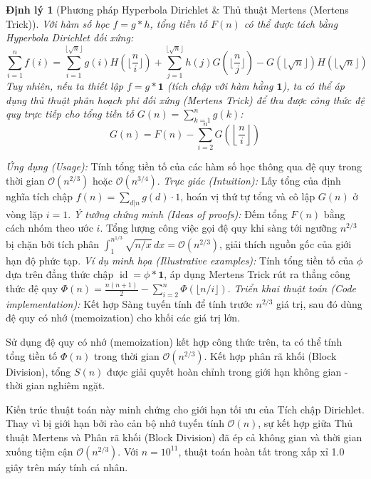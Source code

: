 \documentclass{article}
\newtheorem{dinhly}{Định lý}
\begin{document}
\begin{dinhly}[Phương pháp Hyperbola Dirichlet \& Thủ thuật Mertens (Mertens Trick)]
Với hàm số học $f = g * h$, tổng tiền tố $F(n)$ có thể được tách bằng Hyperbola Dirichlet đối xứng:
\begin{equation*}
    \sum_{i=1}^n f(i) = \sum_{i=1}^{\lfloor\sqrt{n}\rfloor} g(i) H\left(\lfloor\frac{n}{i}\rfloor\right) + \sum_{j=1}^{\lfloor\sqrt{n}\rfloor} h(j) G\left(\lfloor\frac{n}{j}\rfloor\right) - G(\lfloor\sqrt{n}\rfloor) H(\lfloor\sqrt{n}\rfloor)
\end{equation*}
Tuy nhiên, nếu ta thiết lập $f = g * \mathbf{1}$ (tích chập với hàm hằng $\mathbf{1}$), ta có thể áp dụng thủ thuật phân hoạch phi đối xứng (Mertens Trick) để thu được công thức đệ quy trực tiếp cho tổng tiền tố $G(n) = \sum_{k=1}^n g(k)$:
\begin{equation*}
    G(n) = F(n) - \sum_{i=2}^n G\left(\left\lfloor \frac{n}{i} \right\rfloor\right)
\end{equation*}
\end{dinhly}
\emph{Ứng dụng (Usage):} Tính tổng tiền tố của các hàm số học thông qua đệ quy trong thời gian $\mathcal{O}(n^{2/3})$ hoặc $\mathcal{O}(n^{3/4})$.
\emph{Trực giác (Intuition):} Lấy tổng của định nghĩa tích chập $f(n) = \sum_{d|n} g(d) \cdot 1$, hoán vị thứ tự tổng và cô lập $G(n)$ ở vòng lặp $i=1$.
\emph{Ý tưởng chứng minh (Ideas of proofs):} Đếm tổng $F(n)$ bằng cách nhóm theo ước $i$. Tổng lượng công việc gọi đệ quy khi sàng tới ngưỡng $n^{2/3}$ bị chặn bởi tích phân $\int_1^{n^{1/3}} \sqrt{n/x} \, dx = \mathcal{O}(n^{2/3})$, giải thích nguồn gốc của giới hạn độ phức tạp.
\emph{Ví dụ minh họa (Illustrative examples):} Tính tổng tiền tố của $\phi$ dựa trên đẳng thức chập $\operatorname{id} = \phi * \mathbf{1}$, áp dụng Mertens Trick rút ra thẳng công thức đệ quy $\Phi(n) = \frac{n(n+1)}{2} - \sum_{i=2}^n \Phi(\lfloor n/i \rfloor)$.
\emph{Triển khai thuật toán (Code implementation):} Kết hợp Sàng tuyến tính để tính trước $n^{2/3}$ giá trị, sau đó dùng đệ quy có nhớ (memoization) cho khối các giá trị lớn.

Sử dụng đệ quy có nhớ (memoization) kết hợp công thức trên, ta có thể tính tổng tiền tố $\Phi(n)$ trong thời gian $\mathcal{O}(n^{2/3})$. Kết hợp phân rã khối (Block Division), tổng $S(n)$ được giải quyết hoàn chỉnh trong giới hạn không gian - thời gian nghiêm ngặt.


Kiến trúc thuật toán này minh chứng cho giới hạn tối ưu của Tích chập Dirichlet. Thay vì bị giới hạn bởi rào cản bộ nhớ tuyến tính $\mathcal{O}(n)$, sự kết hợp giữa Thủ thuật Mertens và Phân rã khối (Block Division) đã ép cả không gian và thời gian xuống tiệm cận $\mathcal{O}(n^{2/3})$. Với $n=10^{11}$, thuật toán hoàn tất trong xấp xỉ 1.0 giây trên máy tính cá nhân. 
\end{document}
